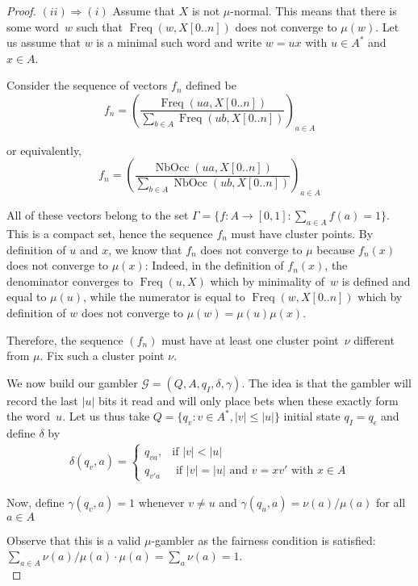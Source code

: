 \documentclass[11pt]{article}
\newcommand{\G}{\mathcal{G}}
\newcommand{\emptystr}{\epsilon}
\DeclareMathOperator{\nbocc}{NbOcc}
\DeclareMathOperator{\freq}{Freq}
\begin{document}
\begin{proof}
$(ii) \Rightarrow (i)$ Assume that $X$ is not $\mu$-normal. This means that there is some word~$w$ such that $\freq(w,X[0..n])$ does not converge to $\mu(w)$. Let us assume that $w$ is a minimal such word and write $w=ux$ with $u \in A^*$ and $x \in A$. 

Consider the sequence of vectors $f_n$ defined be
\[
f_n = \left( \frac{\freq(ua,X[0..n])}{\sum_{b \in A} \freq(ub,X[0..n])} \right)_{a \in A}
\]
 
or equivalently, 
\[
f_n = \left( \frac{\nbocc(ua,X[0..n])}{\sum_{b \in A} \nbocc(ub,X[0..n])} \right)_{a \in A} 
\]


All of these vectors belong to the set $\Gamma=\{f: A \rightarrow [0,1] : \sum_{a \in A} f(a)=1\}$. This is a compact set, hence the sequence $f_n$ must have cluster points. By definition of $u$ and $x$, we know that $f_n$ does not converge to $\mu$ because $f_n(x)$ does not converge to $\mu(x)$: Indeed, in the definition of $f_n(x)$, the denominator converges to $\freq(u,X)$ which by minimality of~$w$ is defined and equal to $\mu(u)$, while the numerator is equal to $\freq(w,X[0..n])$ which by definition of $w$ does not converge to $\mu(w)=\mu(u)\mu(x)$. 


Therefore, the sequence $(f_n)$ must have at least one cluster point~$\nu$ different from $\mu$. Fix such a cluster point $\nu$. 

We now build our gambler $\G=(Q,A,q_I,\delta,\gamma)$. The idea is that the gambler will record the last $|u|$ bits it read and will only place bets when these exactly form the word~$u$. Let us thus take $Q=\{q_v : v \in A^*, |v| \leq |u|\}$ initial state $q_I=q_\emptystr$ and define $\delta$ by 
\begin{align*}
\delta(q_v,a)= \begin{cases}
		q_{va}, & \text{if } \lvert v \rvert < |u|\\
		q_{v'a} & \text{ if } |v|=|u| \text{ and } v=xv' \text{ with } x \in A		\end{cases}
\end{align*}

Now, define $\gamma(q_v,a)=1$ whenever $v \not= u$ and $\gamma(q_u,a) = \nu(a)/\mu(a)$ for all~$a \in A$ 
%


Observe that this is a valid $\mu$-gambler as the fairness condition is satisfied: $\sum_{a \in A} \nu(a)/\mu(a) \cdot \mu(a) = \sum_a \nu(a) = 1$.\\


\end{proof}
\end{document}
